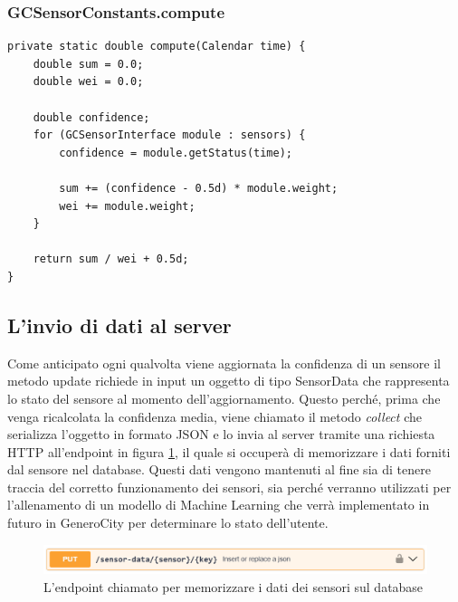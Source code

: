 \subsubsection{GCSensorConstants.compute}
\begin{verbatim}
private static double compute(Calendar time) {
    double sum = 0.0;
    double wei = 0.0;

    double confidence;
    for (GCSensorInterface module : sensors) {
        confidence = module.getStatus(time);

        sum += (confidence - 0.5d) * module.weight;
        wei += module.weight;
    }

    return sum / wei + 0.5d;
}
\end{verbatim}

\subsection{L'invio di dati al server}\label{chap:sensorData}
Come anticipato ogni qualvolta viene aggiornata la confidenza di un sensore il metodo update richiede in input un oggetto di tipo SensorData che rappresenta lo stato del sensore al momento dell'aggiornamento. Questo perché, prima che venga ricalcolata la confidenza media, viene chiamato il metodo \textit{collect} che serializza l'oggetto in formato JSON e lo invia al server tramite una richiesta HTTP all'endpoint in figura \ref{fig:endpoint}, il quale si occuperà di memorizzare i dati forniti dal sensore nel database. Questi dati vengono mantenuti al fine sia di tenere traccia del corretto funzionamento dei sensori, sia perché verranno utilizzati per l'allenamento di un modello di Machine Learning che verrà implementato in futuro in GeneroCity per determinare lo stato dell'utente.

\begin{figure}[h]
    \centering
    \includegraphics[width=1\linewidth]{images/endpoint.png}
    \caption{L'endpoint chiamato per memorizzare i dati dei sensori sul database}
    \label{fig:endpoint}
\end{figure}

